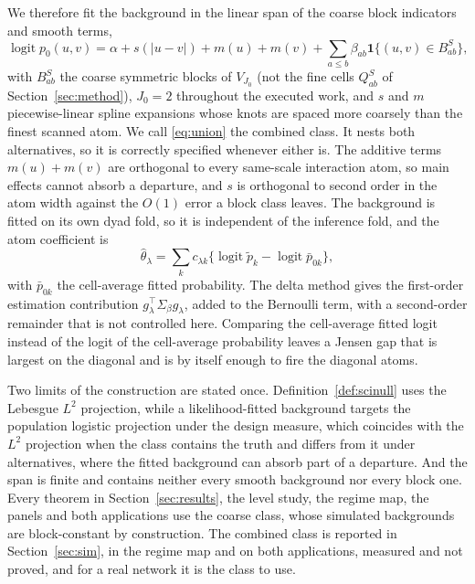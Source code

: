\documentclass[11pt]{article}
\theoremstyle{definition}
\newcommand{\1}{\mathbf 1}\newcommand{\op}{\operatorname}
\begin{document}
We therefore fit the background in the linear span of the coarse block
indicators and smooth terms,
\begin{equation}
\operatorname{logit}p_0(u,v)=\alpha+s(|u-v|)+m(u)+m(v)+\textstyle\sum_{a\le b}\beta_{ab}\1\{(u,v)\in B^S_{ab}\},
\label{eq:union}
\end{equation}
with $B^S_{ab}$ the coarse symmetric blocks of $V_{J_0}$ (not the fine cells
$Q^S_{ab}$ of Section~\ref{sec:method}), $J_0=2$ throughout the executed
work, and $s$ and $m$ piecewise-linear spline expansions whose knots are
spaced more coarsely than the finest scanned atom.  We call \eqref{eq:union}
the combined class.  It nests both alternatives, so it is correctly specified
whenever either is.  The additive terms $m(u)+m(v)$ are orthogonal to every
same-scale interaction atom, so main effects cannot absorb a departure, and
$s$ is orthogonal to second order in the atom width against the $O(1)$ error a
block class leaves.  The background is fitted on its own dyad fold, so it is
independent of the inference fold, and the atom coefficient is
\begin{equation}
\widehat\theta_\lambda=\sum_k c_{\lambda k}\{\operatorname{logit}\widetilde p_k-\operatorname{logit}\bar p_{0k}\},
\label{eq:unioncoef}
\end{equation}
with $\bar p_{0k}$ the cell-average fitted probability.  The delta method gives
the first-order estimation contribution $g_\lambda^\top\Sigma_\beta g_\lambda$,
added to the Bernoulli term, with a second-order remainder that is not
controlled here.  Comparing the cell-average fitted logit instead of the logit
of the cell-average probability leaves a Jensen gap that is largest on the
diagonal and is by itself enough to fire the diagonal atoms.

Two limits of the construction are stated once.  Definition~\ref{def:scinull}
uses the Lebesgue $L^2$ projection, while a likelihood-fitted background
targets the population logistic projection under the design measure, which
coincides with the $L^2$ projection when the class contains the truth and
differs from it under alternatives, where the fitted background can absorb
part of a departure.  And the span is finite and contains neither every smooth
background nor every block one.  Every theorem in Section~\ref{sec:results},
the level study, the regime map, the panels and both applications use the
coarse class, whose simulated backgrounds are block-constant by construction.
The combined class is reported in Section~\ref{sec:sim}, in the
regime map and on both applications, measured and not proved, and for a real
network it is the class to use.
\end{document}
